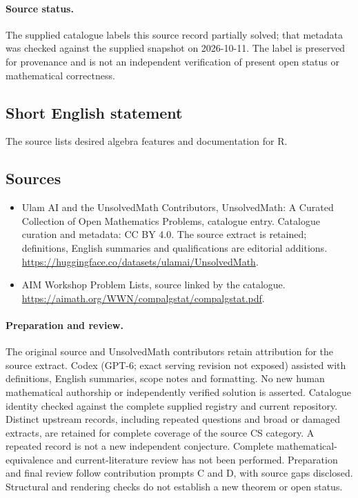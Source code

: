 \documentclass[11pt]{article}
\begin{document}
\paragraph{Source status.}
The supplied catalogue labels this source record partially solved; that metadata was checked against the supplied snapshot on 2026-10-11. The label is preserved for provenance and is not an independent verification of present open status or mathematical correctness.
\subsection{Short English statement}
The source lists desired algebra features and documentation for R.
\subsection{Sources}
\begin{itemize}
\item[\hypertarget{source:statement:1}{S1}] Ulam AI and the UnsolvedMath Contributors, UnsolvedMath: A Curated Collection of Open Mathematics Problems, catalogue entry. Catalogue curation and metadata: CC BY 4.0. The source extract is retained; definitions, English summaries and qualifications are editorial additions.
\url{https://huggingface.co/datasets/ulamai/UnsolvedMath}.
\item[\hypertarget{source:statement:2}{S2}] AIM Workshop Problem Lists, source linked by the catalogue.
\url{https://aimath.org/WWN/compalgstat/compalgstat.pdf}.
\end{itemize}
\paragraph{Preparation and review.}
The original source and UnsolvedMath contributors retain attribution for the source extract. Codex (GPT-6; exact serving revision not exposed) assisted with definitions, English summaries, scope notes and formatting. No new human mathematical authorship or independently verified solution is asserted. Catalogue identity checked against the complete supplied registry and current repository. Distinct upstream records, including repeated questions and broad or damaged extracts, are retained for complete coverage of the source CS category. A repeated record is not a new independent conjecture. Complete mathematical-equivalence and current-literature review has not been performed. Preparation and final review follow contribution prompts C and D, with source gaps disclosed. Structural and rendering checks do not establish a new theorem or open status.
\label{end:statement}
\end{document}
